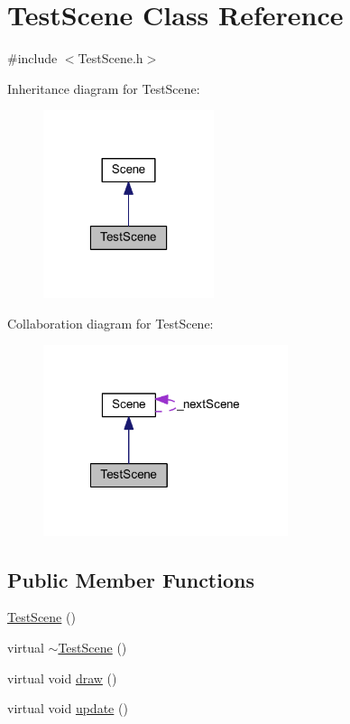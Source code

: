 \hypertarget{class_test_scene}{
\section{TestScene Class Reference}
\label{de/d8c/class_test_scene}
}


{\ttfamily \#include $<$TestScene.h$>$}



Inheritance diagram for TestScene:
\nopagebreak
\begin{figure}[H]
\begin{center}
\leavevmode
\includegraphics[width=142pt]{d8/d5a/class_test_scene__inherit__graph}
\end{center}
\end{figure}


Collaboration diagram for TestScene:
\nopagebreak
\begin{figure}[H]
\begin{center}
\leavevmode
\includegraphics[width=203pt]{d9/d06/class_test_scene__coll__graph}
\end{center}
\end{figure}
\subsection*{Public Member Functions}
\begin{DoxyCompactItemize}
\item 
\hyperlink{class_test_scene_a04fd916e8e52cd1335fc05e2ebf1c8df}{TestScene} ()
\item 
virtual \hyperlink{class_test_scene_a2b795cb6074e9d9deb8e51afa5ba5f58}{$\sim$TestScene} ()
\item 
virtual void \hyperlink{class_test_scene_a18633fba568283d4e2b7c4d6ff2aec23}{draw} ()
\item 
virtual void \hyperlink{class_test_scene_a7bfc7a796b5837eb35b03f878d623fe1}{update} ()
\end{DoxyCompactItemize}


